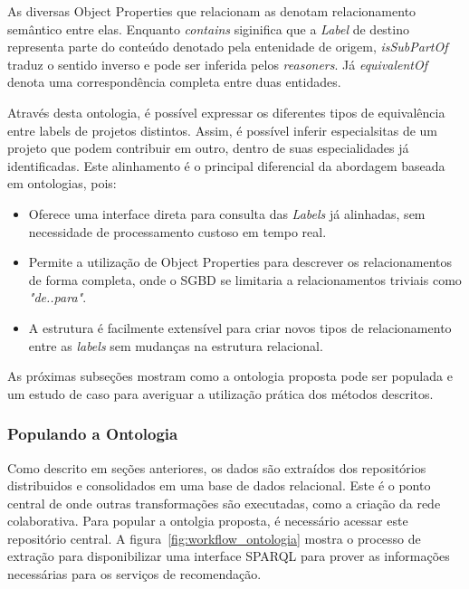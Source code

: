 \documentclass[sigconf]{acmart}
\begin{document}
As diversas Object Properties que relacionam as  denotam relacionamento semântico entre elas. Enquanto \textit{contains} siginifica que a \textit{Label} de destino representa parte do conteúdo denotado pela entenidade de origem, \textit{isSubPartOf} traduz o sentido inverso e pode ser inferida pelos \textit{reasoners}. Já \textit{equivalentOf} denota uma correspondência completa entre duas entidades.

Através desta ontologia, é possível expressar os diferentes tipos de equivalência entre labels de projetos distintos. Assim, é possível inferir especialsitas de um projeto que podem contribuir em outro, dentro de suas especialidades já identificadas. Este alinhamento é o principal diferencial da abordagem baseada em ontologias, pois:

\begin{itemize}
  \item Oferece uma interface direta para consulta das \textit{Labels} já alinhadas, sem necessidade de processamento custoso em tempo real.
  \item Permite a utilização de Object Properties para descrever os relacionamentos de forma completa, onde o SGBD se limitaria a relacionamentos triviais como \textit{"de..para"}.
  \item A estrutura é facilmente extensível para criar novos tipos de relacionamento entre as \textit{labels} sem mudanças na estrutura relacional.
\end{itemize}

As próximas subseções mostram como a ontologia proposta pode ser populada e um estudo de caso para averiguar a utilização prática dos métodos descritos.

\subsubsection{Populando a Ontologia}

Como descrito em seções anteriores, os dados são extraídos dos repositórios distribuidos e consolidados em uma base de dados relacional. Este é o ponto central de onde outras transformações são executadas, como a criação da rede colaborativa. Para popular a ontolgia proposta, é necessário acessar este repositório central. A figura~\ref{fig:workflow_ontologia} mostra o processo de extração para disponibilizar uma interface SPARQL para prover as informações necessárias para os serviços de recomendação.
\end{document}
